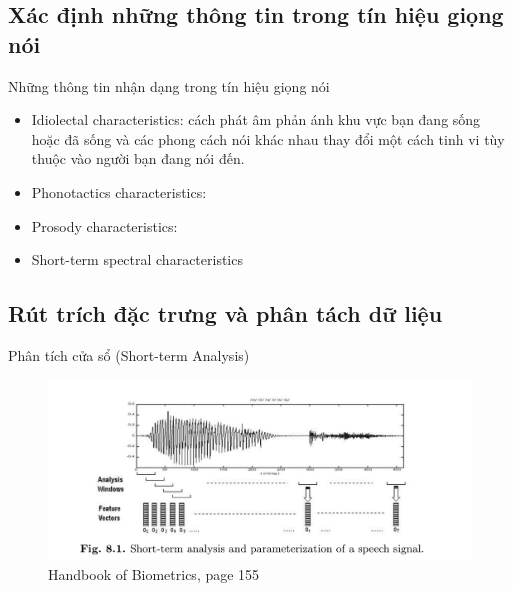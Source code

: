 \documentclass[notheorems, aspectratio=54]{beamer}
\begin{document}
\subsection{Xác định những thông tin trong tín hiệu giọng nói}
\begin{frame}
	Những thông tin nhận dạng trong tín hiệu giọng nói
	\begin{itemize}
		\item Idiolectal characteristics: cách phát âm phản ánh khu vực bạn đang sống hoặc đã sống và các phong cách nói khác nhau thay đổi một cách tinh vi tùy thuộc vào người bạn đang nói đến.
		\item Phonotactics characteristics: 
		\item Prosody characteristics:
		\item Short-term spectral characteristics
	\end{itemize}
\end{frame}

\subsection{Rút trích đặc trưng và phân tách dữ liệu}
\begin{frame}{Phân tích cửa sổ (Short-term Analysis)}
	\begin{figure}[h!]
		\includegraphics[width=0.9\linewidth]{images/figure_8_1.png}
		\caption{Handbook of Biometrics, page 155}
		\label{fig:writing-thesis}
	\end{figure}
\end{frame}
\end{document}
